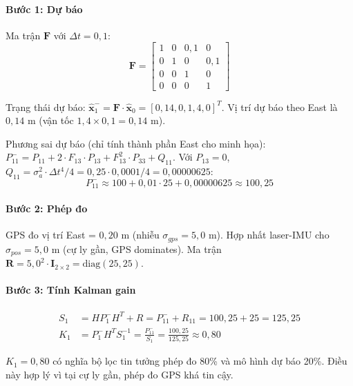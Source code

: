 \paragraph{Bước 1: Dự báo\\} Ma trận $\mathbf{F}$ với $\Delta t = 0{,}1$:
\begin{equation}
    \mathbf{F} = \begin{bmatrix} 1 & 0 & 0{,}1 & 0 \\ 0 & 1 & 0 & 0{,}1 \\ 0 & 0 & 1 & 0 \\ 0 & 0 & 0 & 1 \end{bmatrix}
\end{equation}

Trạng thái dự báo: $\hat{\mathbf{x}}_1^- = \mathbf{F} \cdot \hat{\mathbf{x}}_0 = [0{,}14, 0, 1{,}4, 0]^T$. Vị trí dự báo theo East là $0{,}14$ m (vận tốc $1{,}4 \times 0{,}1 = 0{,}14$ m).

Phương sai dự báo (chỉ tính thành phần East cho minh họa): $P_{11}^- = P_{11} + 2 \cdot F_{13} \cdot P_{13} + F_{13}^2 \cdot P_{33} + Q_{11}$. Với $P_{13} = 0$, $Q_{11} = \sigma_a^2 \cdot \Delta t^4 / 4 = 0{,}25 \cdot 0{,}0001 / 4 = 0{,}00000625$:
\begin{equation}
    P_{11}^- \approx 100 + 0{,}01 \cdot 25 + 0{,}00000625 \approx 100{,}25
\end{equation}

\paragraph{Bước 2: Phép đo\\} GPS đo vị trí East = $0{,}20$ m (nhiễu $\sigma_{gps} = 5{,}0$ m). Hợp nhất laser-IMU cho $\sigma_{pos} = 5{,}0$ m (cự ly gần, GPS dominates). Ma trận $\mathbf{R} = 5{,}0^2 \cdot \mathbf{I}_{2\times2} = \text{diag}(25, 25)$.

\paragraph{Bước 3: Tính Kalman gain\\}
\begin{align*}
    S_1 &= H P_1^- H^T + R = P_{11}^- + R_{11} = 100{,}25 + 25 = 125{,}25 \\
    K_1 &= P_1^- H^T S_1^{-1} = \frac{P_{11}^-}{S_1} = \frac{100{,}25}{125{,}25} \approx 0{,}80
\end{align*}

$K_1 = 0{,}80$ có nghĩa bộ lọc tin tưởng phép đo 80\% và mô hình dự báo 20\%. Điều này hợp lý vì tại cự ly gần, phép đo GPS khá tin cậy.

